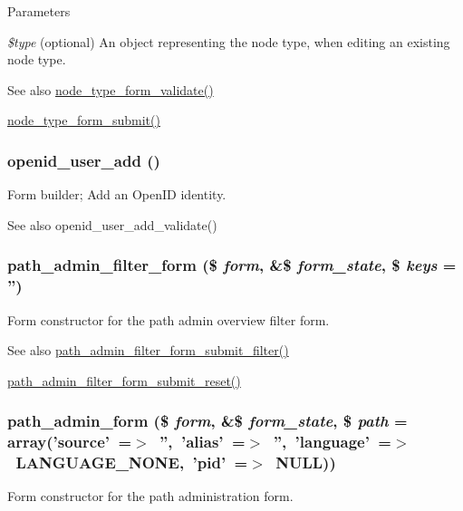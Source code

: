 \begin{DoxyParams}{Parameters}
\item[{\em \$type}](optional) An object representing the node type, when editing an existing node type.\end{DoxyParams}
\begin{DoxySeeAlso}{See also}
\hyperlink{content__types_8inc_a9bce2bd1a17217d5573cdc8b4465c1f9}{node\_\-type\_\-form\_\-validate()} 

\hyperlink{content__types_8inc_afa55f7240b05f2a2804c11766228a5af}{node\_\-type\_\-form\_\-submit()} 
\end{DoxySeeAlso}
\hypertarget{group__forms_ga53081778c1fc8e8ff8ab89f9000774b7}{
\subsubsection[{openid\_\-user\_\-add}]{\setlength{\rightskip}{0pt plus 5cm}openid\_\-user\_\-add ()}}
\label{group__forms_ga53081778c1fc8e8ff8ab89f9000774b7}
Form builder; Add an OpenID identity.

\begin{DoxySeeAlso}{See also}
openid\_\-user\_\-add\_\-validate() 
\end{DoxySeeAlso}
\hypertarget{group__forms_ga2ef41a9ef077b1b4c0fbfa2971c155d1}{
\subsubsection[{path\_\-admin\_\-filter\_\-form}]{\setlength{\rightskip}{0pt plus 5cm}path\_\-admin\_\-filter\_\-form (\$ {\em form}, \/  \&\$ {\em form\_\-state}, \/  \$ {\em keys} = {\ttfamily ''})}}
\label{group__forms_ga2ef41a9ef077b1b4c0fbfa2971c155d1}
Form constructor for the path admin overview filter form.

\begin{DoxySeeAlso}{See also}
\hyperlink{path_8admin_8inc_a250d1de05853ce7562fb1b9530dba273}{path\_\-admin\_\-filter\_\-form\_\-submit\_\-filter()} 

\hyperlink{path_8admin_8inc_a89dc681fab5e84263049933d97823291}{path\_\-admin\_\-filter\_\-form\_\-submit\_\-reset()} 
\end{DoxySeeAlso}
\hypertarget{group__forms_ga712dc47396e1cfb8f1872920973db244}{
\subsubsection[{path\_\-admin\_\-form}]{\setlength{\rightskip}{0pt plus 5cm}path\_\-admin\_\-form (\$ {\em form}, \/  \&\$ {\em form\_\-state}, \/  \$ {\em path} = {\ttfamily array('source'~=$>$~'',~'alias'~=$>$~'',~'language'~=$>$~{\bf LANGUAGE\_\-NONE},~'pid'~=$>$~NULL)})}}
\label{group__forms_ga712dc47396e1cfb8f1872920973db244}
Form constructor for the path administration form.


